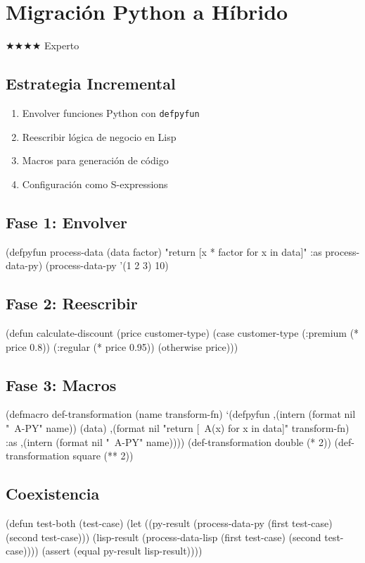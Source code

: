 \chapter{Migración Python a Híbrido}
\label{chap:migration}
{\huge$\bigstar$}{\huge$\bigstar$}{\huge$\bigstar$}{\huge$\bigstar$} Experto

\section{Estrategia Incremental}
\begin{enumerate}
\item Envolver funciones Python con \texttt{defpyfun}
\item Reescribir lógica de negocio en Lisp
\item Macros para generación de código
\item Configuración como S-expressions
\end{enumerate}

\section{Fase 1: Envolver}
\begin{lispcode}
(defpyfun process-data (data factor)
  "return [x * factor for x in data]"
  :as process-data-py)
(process-data-py '(1 2 3) 10)
\end{lispcode}

\section{Fase 2: Reescribir}
\begin{lispcode}
(defun calculate-discount (price customer-type)
  (case customer-type
    (:premium (* price 0.8))
    (:regular (* price 0.95))
    (otherwise price)))
\end{lispcode}

\section{Fase 3: Macros}
\begin{lispcode}
(defmacro def-transformation (name transform-fn)
  `(defpyfun ,(intern (format nil "~A-PY" name)) (data)
     ,(format nil "return [~A(x) for x in data]" transform-fn)
     :as ,(intern (format nil "~A-PY" name))))
(def-transformation double (* 2))
(def-transformation square (** 2))
\end{lispcode}

\section{Coexistencia}
\begin{lispcode}
(defun test-both (test-case)
  (let ((py-result (process-data-py (first test-case) (second test-case)))
        (lisp-result (process-data-lisp (first test-case) (second test-case))))
    (assert (equal py-result lisp-result))))
\end{lispcode}

